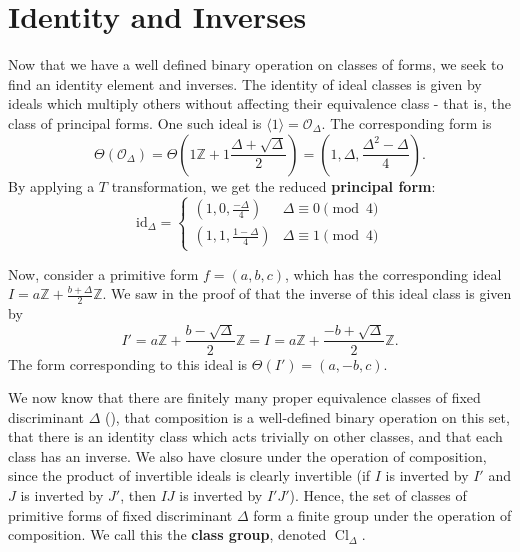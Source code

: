 \documentclass[honours,12pt]{unswthesis}
\newcommand{\Z}{\mathbb{Z}} %
\newcommand{\order}{\mathcal{O}} %
\DeclareMathOperator{\Cl}{Cl}
\numberwithin{equation}{section}
\begin{document}
\section{Identity and Inverses}\label{s-comp-idinv}
Now that we have a well defined binary operation on classes of forms, we seek to find an identity element and inverses.
The identity of ideal classes is given by ideals which multiply others without affecting their equivalence class - that is, the class of principal forms.
One such ideal is $\langle 1 \rangle = \order_\Delta$.
The corresponding form is
$$\Theta(\order_\Delta) = \Theta \left( 1\Z + 1\frac{\Delta + \sqrt\Delta}{2} \right) = \left(1, \Delta, \frac{\Delta^2 - \Delta}{4} \right).$$
By applying a $T$ transformation, we get the reduced \textbf{principal form}:
$$\text{id}_\Delta = \begin{cases}
    \left( 1, 0, \frac{-\Delta}{4} \right) & \Delta \equiv 0 \pmod{4} \\
    \left( 1, 1, \frac{1 - \Delta}{4} \right) & \Delta \equiv 1 \pmod{4}
\end{cases}$$

Now, consider a primitive form $f = (a, b, c)$, which has the corresponding ideal $I = a\Z + \frac{b + \Delta}{2}\Z$.
We saw in the proof of  that the inverse of this ideal class is given by
$$I' = a\Z + \frac{b - \sqrt\Delta}{2}\Z = I = a\Z + \frac{-b + \sqrt\Delta}{2}\Z.$$
The form corresponding to this ideal is $\Theta(I') = (a, -b, c)$.

We now know that there are finitely many proper equivalence classes of fixed discriminant $\Delta$ (), that composition is a well-defined binary operation on this set, that there is an identity class which acts trivially on other classes, and that each class has an inverse.
We also have closure under the operation of composition, since the product of invertible ideals is clearly invertible (if $I$ is inverted by $I'$ and $J$ is inverted by $J'$, then $IJ$ is inverted by $I'J'$).
Hence, the set of classes of primitive forms of fixed discriminant $\Delta$ form a finite group under the operation of composition.
We call this the \textbf{class group}, denoted $\Cl_\Delta$.



\end{document}
